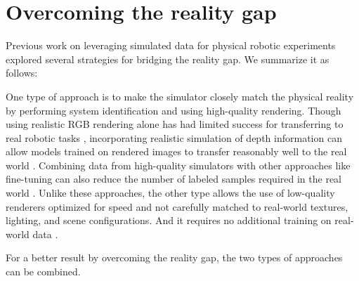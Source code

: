 \section{Overcoming the reality gap}
Previous work on leveraging simulated data for physical robotic experiments explored several strategies for bridging the reality gap. We summarize it as follows:

One type of approach is to make the simulator closely match the physical reality by performing system identification and using high-quality rendering. Though using realistic RGB rendering alone has had limited success for transferring to real robotic tasks \cite{james20163d}, incorporating realistic simulation of depth information can allow models trained on rendered images to transfer reasonably well to the real world \cite{planche2017depthsynth}. Combining data from high-quality simulators with other approaches like fine-tuning can also reduce the number of labeled samples required in the real world \cite{richter2016playing}. Unlike these approaches, the other type allows the use of low-quality renderers optimized for speed and not carefully matched to real-world textures, lighting, and scene configurations. And it requires no additional training on real-world data \cite{tobin2017domain}.

For a better result by overcoming the reality gap, the two types of approaches can be combined.





